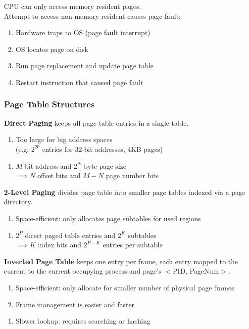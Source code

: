 \documentclass[12pt, a4paper]{article}
\begin{document}
\begin{multicols*}{3}
CPU can only access memory resident pages.\\Attempt to access non-memory resident causes page fault:
\begin{enumerate}[\roman*.]
  \item Hardware traps to OS (page fault interrupt)
  \item OS locates page on disk 
  \item Run page replacement and update page table
  \item Restart instruction that caused page fault
\end{enumerate}

\subsubsection{Page Table Structures}
\textbf{Direct Paging} keeps all page table entries in a single table.
\begin{enumerate}[$-$]
  \item Too large for big address spaces\\(e.g. $2^{20}$ entries for 32-bit addresses, 4KB pages)
\end{enumerate}\vspace{-1pt}
\begin{enumerate}[\roman*.]
  \item $M$-bit address and $2^N$ byte page size\\$\implies N$ offset bits and $M-N$ page number bits 
\end{enumerate}

\textbf{2-Level Paging} divides page table into smaller page tables indexed via a page directory.
\begin{enumerate}[$+$]
  \item Space-efficient: only allocates page subtables for used regions
\end{enumerate}\vspace{-1pt}
\begin{enumerate}[\roman*.]
  \item $2^P$ direct paged table entries and $2^K$ subtables\\$\implies K$ index bits and $2^{P-K}$ entries per subtable
\end{enumerate}

\textbf{Inverted Page Table} keeps one entry per frame, each entry mapped to the current to the current occupying process and page's $<$PID, PageNum$>$.
\begin{enumerate}[$+$]
  \item Space-efficient: only allocate for smaller number of physical page frames
  \item Frame management is easier and faster
\end{enumerate}\vspace{-1pt}
\begin{enumerate}[$-$]
  \item Slower lookup; requires searching or hashing
\end{enumerate}


\end{multicols*}
\end{document}
